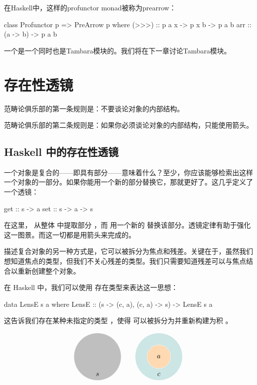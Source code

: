 \documentclass[DaoFP]{subfiles}
\begin{document}
在Haskell中，这样的profunctor monad被称为prearrow：
\begin{haskell}
class Profunctor p => PreArrow p where
  (>>>) :: p a x -> p x b -> p a b
  arr   :: (a -> b) -> p a b
\end{haskell}
一个是一个同时也是Tambara模块的。我们将在下一章讨论Tambara模块。

\section{存在性透镜}

范畴论俱乐部的第一条规则是：不要谈论对象的内部结构。

范畴论俱乐部的第二条规则是：如果你必须谈论对象的内部结构，只能使用箭头。

\subsection{Haskell 中的存在性透镜}

一个对象是复合的——即具有部分——意味着什么？至少，你应该能够检索出这样一个对象的一部分。如果你能用一个新的部分替换它，那就更好了。这几乎定义了一个透镜：
\begin{haskell}
get :: s -> a
set :: s -> a -> s
\end{haskell}
在这里， 从整体  中提取部分 ，而  用一个新的  替换该部分。透镜定律有助于强化这一图景。而这一切都是用箭头来完成的。

描述复合对象的另一种方式是，它可以被拆分为焦点和残差。关键在于，虽然我们想知道焦点的类型，但我们不关心残差的类型。我们只需要知道残差可以与焦点结合以重新创建整个对象。

在 Haskell 中，我们可以使用 存在类型来表达这一思想：
\begin{haskell}
data LensE s a where
    LensE :: (s -> (c, a), (c, a) -> s) -> LensE s a
\end{haskell}
这告诉我们存在某种未指定的类型 ，使得  可以被拆分为并重新构建为积 。

\[
\begin{tikzpicture}
\filldraw[fill=gray!50, draw=white] (0, 0) circle (1.2);
\node at (0, -0.9) {$s$};
\end{tikzpicture}
\hspace{20pt}
\begin{tikzpicture}
\filldraw[fill=blue!50!green!20, draw=white] (0, 0) circle (1.2);
\filldraw[fill=orange!30, draw=white] (0, 0) circle (0.6);
\node at (0, 0) {$a$};
\node at (0, -0.9) {$c$};
\end{tikzpicture}
\]
\end{document}
